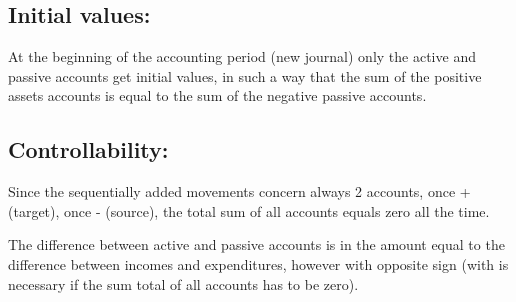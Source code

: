 \subsection{ Initial values:} 

At the beginning of the accounting period (new journal) only the active and
passive accounts get initial values, in such a way that the sum of the positive
assets accounts is equal to the sum of the negative passive accounts.

\subsection{ Controllability:} 

 Since the sequentially added movements concern always 2 accounts,
once + (target), once - (source), the total sum of all accounts equals zero all
the time.

 The difference between active and passive accounts is in the amount equal
to the difference between incomes and expenditures, however with opposite sign
(with is necessary if  the sum total of all accounts has to be zero).

